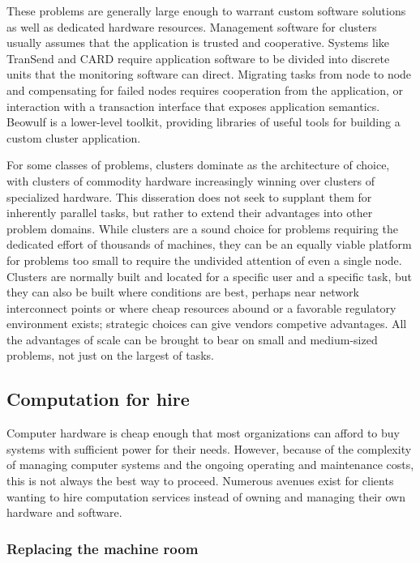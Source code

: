 These problems are generally large enough to warrant custom software solutions as well as dedicated hardware resources. Management software for clusters usually assumes that the application is trusted and cooperative. Systems like TranSend \cite{fox} and CARD \cite{anderson97} require application software to be divided into discrete units that the monitoring software can direct. Migrating tasks from node to node and compensating for failed nodes requires cooperation from the application, or interaction with a transaction interface that exposes application semantics. Beowulf \cite{ridge} is a lower-level toolkit, providing libraries of useful tools for building a custom cluster application.

For some classes of problems, clusters dominate as the architecture of choice, with clusters of commodity hardware increasingly winning over clusters of specialized hardware. This disseration does not seek to supplant them for inherently parallel tasks, but rather to extend their advantages into other problem domains. While clusters are a sound choice for problems requiring the dedicated effort of thousands of machines, they can be an equally viable platform for problems too small to require the undivided attention of even a single node. Clusters are normally built and located for a specific user and a specific task, but they can also be built where conditions are best, perhaps near network interconnect points or where cheap resources abound or a favorable regulatory environment exists; strategic choices can give vendors competive advantages. All the advantages of scale can be brought to bear on small and medium-sized problems, not just on the largest of tasks.

\subsection{Computation for hire}

Computer hardware is cheap enough that most organizations can afford to buy systems with sufficient power for their needs. However, because of the complexity of managing computer systems and the ongoing operating and maintenance costs, this is not always the best way to proceed. Numerous avenues exist for clients wanting to hire computation services instead of owning and managing their own hardware and software.

\subsubsection{Replacing the machine room}

